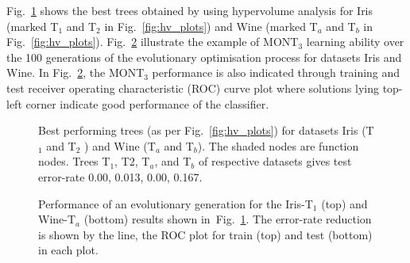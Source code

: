 \documentclass[conference]{IEEEtran}
\begin{document}
Fig.~\ref{fig:nt_best_wine} shows the best trees obtained by using hypervolume analysis for Iris (marked T$_1$ and T$_2$ in Fig.~\ref{fig:hv_plots}) and Wine (marked T$_a$ and T$_b$ in Fig.~\ref{fig:hv_plots}). Fig.~\ref{fig:nt_best_wine_itr} illustrate the example of MONT$_3$ learning ability over the 100 generations of the evolutionary optimisation process for datasets Iris and Wine. In Fig.~\ref{fig:nt_best_wine_itr}, the MONT$_3$ performance is also indicated through training and test receiver operating characteristic (ROC) curve plot where solutions lying top-left corner indicate good performance of the classifier.


\begin{figure}
    \caption{Best performing trees (as per Fig.~\ref{fig:hv_plots}) for datasets Iris (T$_1$ and T$_2$ ) and Wine (T$_a$ and T$_b$). The shaded nodes are function nodes. Trees T$_1$, T$2$, T$_a$, and T$_b$ of respective datasets gives test error-rate 0.00, 0.013, 0.00, 0.167. } \label{fig:nt_best_wine}
\end{figure}



\begin{figure}
    
    \caption{Performance of an evolutionary generation for the Iris-T$_1$ (top) and Wine-T$_a$ (bottom) results shown in~Fig.~\ref{fig:nt_best_wine}. The error-rate reduction is shown by the line, the ROC plot for train (top) and test (bottom) in each plot.}
    \label{fig:nt_best_wine_itr}
\end{figure}
\end{document}
